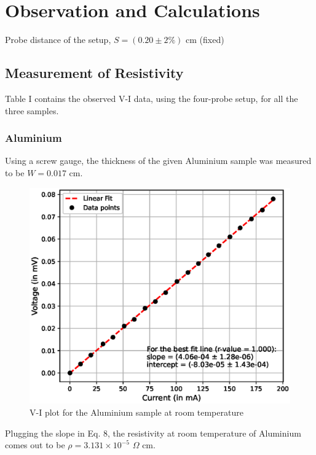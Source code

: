 \section{Observation and Calculations}
\noindent Probe distance of the setup, $S=(0.20 \pm 2\%)$ cm (fixed)
\subsection{Measurement of Resistivity}
Table I contains the observed V-I data, using the four-probe setup, for all the three samples.

\subsubsection{Aluminium}
Using a screw gauge, the thickness of the given Aluminium sample was measured to be $W = 0.017$ cm.
\begin{figure}[H]   
    \centering
    \includegraphics[width=1\columnwidth]{images/al.eps}
    \caption{V-I plot for the Aluminium sample at room temperature}
    \label{1}
\end{figure} 
Plugging the slope in Eq. 8, the resistivity at room temperature of Aluminium comes out to be $\rho = 3.131 \times 10^{-5}\,\,\Omega$ cm.
\vspace{-2em}
